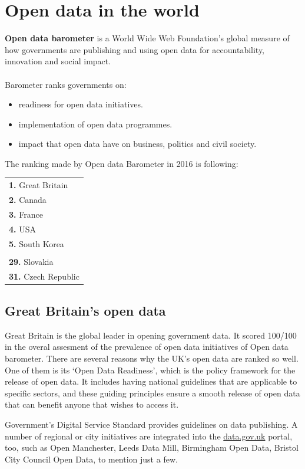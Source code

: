 \documentclass[thesis=B,english]{FITthesis}[2012/06/26]
\begin{document}
	\section{Open data in the world}
	\textbf{Open data barometer} is a World Wide Web Foundation's global measure of how governments are publishing and using open data for accountability, innovation and social impact.\cite{opendatabarometer} \paragraph{} Barometer ranks governments on:
\begin{itemize}
	\item readiness for open data initiatives.
	\item implementation of open data programmes.
	\item impact that open data have on business, politics and civil society.
\end{itemize}
The ranking made by Open data Barometer in 2016 is following:
\begin{center}
\begin{tabular}{l}
  \textbf{1.} Great Britain \\
  \textbf{2.} Canada \\
  \textbf{3.} France \\
  \textbf{4.} USA \\
  \textbf{5.} South Korea \\
  \\
  \textbf{29.} Slovakia \\
  \textbf{31.} Czech Republic \\
\end{tabular}
\end{center}
  \subsection{Great Britain's open data}
  Great Britain is the global leader in opening government data. It scored 100/100 in the overal assesment of the prevalence of open data initiatives of Open data barometer.
  There are several reasons why the UK's open data are ranked so well. One of them is its ‘Open Data Readiness’, which is the policy framework for the release of open data. It includes having national guidelines that are applicable to specific sectors, and these guiding principles ensure a smooth release of open data that can benefit anyone that wishes to access it.

Government’s Digital Service Standard provides guidelines on data publishing. A number of regional or city initiatives are integrated into the \href{https://data.gov.uk}{data.gov.uk} portal, too, such as Open Manchester, Leeds Data Mill, Birmingham Open Data, Bristol City Council Open Data, to mention just a few.
\end{document}
